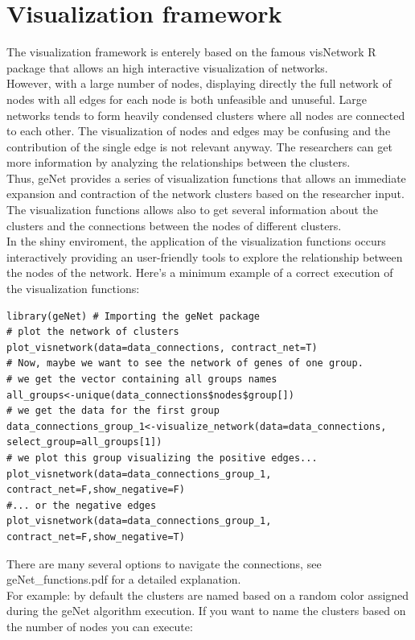 \documentclass{article}
\begin{document}
\section{Visualization framework}
The visualization framework is enterely based on the famous visNetwork R package that allows an high interactive visualization of networks.\\
However, with a large number of nodes, displaying directly the full network of nodes with all edges for each node is both unfeasible and unuseful. Large networks tends to form heavily condensed clusters where all nodes are connected to each other. The visualization of nodes and edges may be confusing and the contribution of the single edge is not relevant anyway. The researchers can get more information  by analyzing the relationships between the clusters.\\
Thus, geNet provides a series of visualization functions that allows an immediate expansion and contraction of the network clusters based on the researcher input. The visualization functions allows also to get several information about the clusters and the connections between the nodes of different clusters.\\
In the shiny enviroment, the application of the visualization functions occurs interactively providing an user-friendly tools to explore the relationship between the nodes of the network.
Here's a minimum example of a correct execution of the visualization functions:
\begin{framed}
\begin{lstlisting}
library(geNet) # Importing the geNet package
# plot the network of clusters
plot_visnetwork(data=data_connections, contract_net=T)
# Now, maybe we want to see the network of genes of one group.
# we get the vector containing all groups names
all_groups<-unique(data_connections$nodes$group[])
# we get the data for the first group
data_connections_group_1<-visualize_network(data=data_connections,
select_group=all_groups[1])
# we plot this group visualizing the positive edges...
plot_visnetwork(data=data_connections_group_1, contract_net=F,show_negative=F)
#... or the negative edges
plot_visnetwork(data=data_connections_group_1, contract_net=F,show_negative=T)
\end{lstlisting}
\end{framed}
There are many several options to navigate the connections, see geNet\_functions.pdf for a detailed explanation.\\
For example: by default the clusters are named based on a random color assigned during the geNet algorithm execution. If you want to name the clusters based on the number of nodes you can execute:
\end{document}
